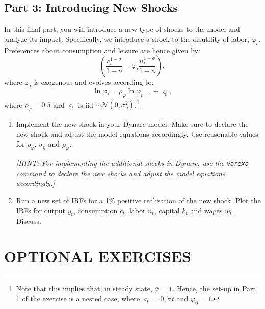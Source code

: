 \documentclass[a4paper,11pt]{article}
\begin{document}
\subsection*{Part 3: Introducing New Shocks}

In this final part, you will introduce a new type of shocks to the model and analyze its impact. Specifically, we introduce a shock to the disutility of labor, $\varphi_t$. Preferences about consumption and leisure are hence given by:
\[
\left( \frac{c_t^{1-\sigma}}{1 - \sigma} - \varphi_t \frac{n_t^{1+\phi}}{1 + \phi} \right),
\]
where $\varphi_t$ is exogenous and evolves according to:
       \[
       \ln \varphi_t = \rho_{\varphi} \ln \varphi_{t-1} + \varsigma_t,
   \]
where $\rho_{\varphi} = 0.5$ and $\varsigma_t$ is iid $\sim \mathcal{N}(0, \sigma^2_\eta)$.\footnote{Note that this implies that, in steady state, $\overline{\varphi} = 1$. Hence, the set-up in Part 1 of the exercise is a nested case, where $\varsigma_t = 0, \forall t$ and $\varphi_0 = 1$. }

       
\begin{enumerate}
    \item[5.] Implement the new shock in your Dynare model. Make sure to declare the new shock and adjust the model equations accordingly. Use reasonable values for \( \rho_\varphi \), \( \sigma_\eta \) and \( \rho_\varphi \).

    
    \textit{[HINT: For implementing the additional shocks in Dynare, use the \texttt{varexo} command to declare the new shocks and adjust the model equations accordingly.]}


    \item[6.] Run a new set of IRFs for a 1\% positive realization of the new shock. Plot the IRFs for output \( y_t \), consumption \( c_t \), labor \( n_t \), capital \( k_t \) and wages \( w_t \). Discuss.

\end{enumerate}


%


\newpage

\section*{OPTIONAL EXERCISES}
\end{document}
